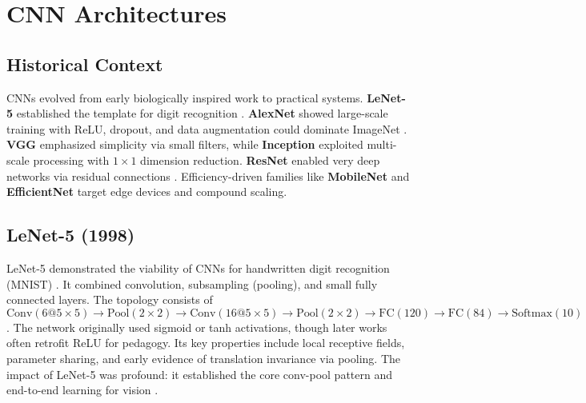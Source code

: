 
\section{CNN Architectures }
\label{sec:cnn-architectures}

\subsection*{Historical Context}
CNNs evolved from early biologically inspired work to practical systems. \textbf{LeNet-5} established the template for digit recognition \cite{LeCun1989}. \textbf{AlexNet} showed large-scale training with ReLU, dropout, and data augmentation could dominate ImageNet \cite{Krizhevsky2012}. \textbf{VGG} emphasized simplicity via small filters, while \textbf{Inception} exploited multi-scale processing with $1\times1$ dimension reduction. \textbf{ResNet} enabled very deep networks via residual connections \cite{He2016}. Efficiency-driven families like \textbf{MobileNet} and \textbf{EfficientNet} target edge devices and compound scaling.
\subsection{LeNet-5 (1998)}
\label{subsec:lenet}

LeNet-5 demonstrated the viability of CNNs for handwritten digit recognition (MNIST) \cite{LeCun1989}. It combined convolution, subsampling (pooling), and small fully connected layers. The topology consists of \(\text{Conv}(6@5\times5)\to\text{Pool}(2\times2)\to\text{Conv}(16@5\times5)\to\text{Pool}(2\times2)\to\text{FC}(120)\to\text{FC}(84)\to\text{Softmax}(10)\). The network originally used sigmoid or tanh activations, though later works often retrofit ReLU for pedagogy. Its key properties include local receptive fields, parameter sharing, and early evidence of translation invariance via pooling. The impact of LeNet-5 was profound: it established the core conv-pool pattern and end-to-end learning for vision \cite{GoodfellowEtAl2016}.

